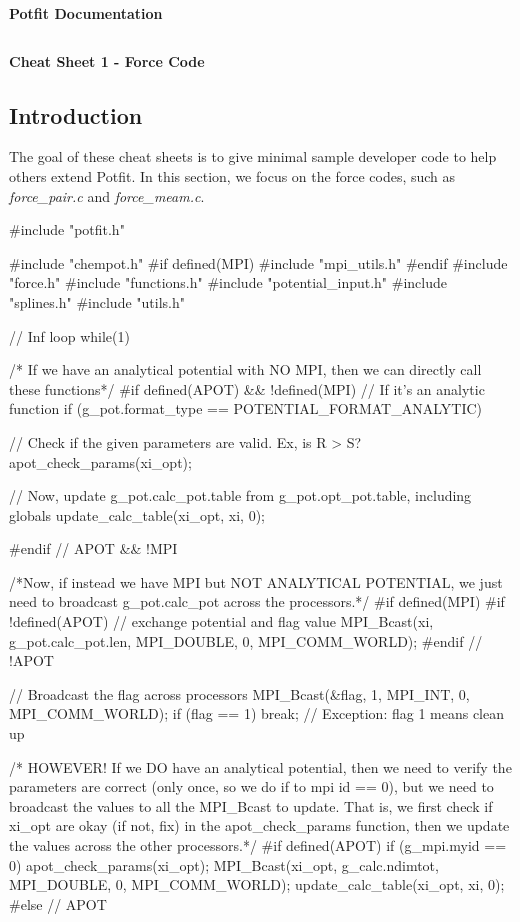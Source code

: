 \documentclass{article}
\newcommand\nline[0]{$ $\\}
\begin{document}
\centerline{\Large \textbf{Potfit Documentation}}
\nline
\centerline{\large \textbf{Cheat Sheet 1 - Force Code}}
\subsection*{Introduction}
The goal of these cheat sheets is to give minimal sample developer code to help others extend Potfit.
In this section, we focus on the force codes, such as \emph{force\_pair.c} and \emph{force\_meam.c}.

\begin{ccode}

#include "potfit.h"

#include "chempot.h"
#if defined(MPI)
#include "mpi_utils.h"
#endif
#include "force.h"
#include "functions.h"
#include "potential_input.h"
#include "splines.h"
#include "utils.h"


// Inf loop
while(1){


  /* If we have an analytical potential with NO MPI, then we
     can directly call these functions*/
#if defined(APOT) && !defined(MPI)
  // If it's an analytic function
  if (g_pot.format_type == POTENTIAL_FORMAT_ANALYTIC) {
    // Check if the given parameters are valid.  Ex, is R > S?
    apot_check_params(xi_opt);

    // Now, update g_pot.calc_pot.table from g_pot.opt_pot.table, including globals
    update_calc_table(xi_opt, xi, 0);
  }
#endif  // APOT && !MPI

  /*Now, if instead we have MPI but NOT ANALYTICAL POTENTIAL, we just
    need to broadcast g_pot.calc_pot across the processors.*/
#if defined(MPI)
#if !defined(APOT)
  // exchange potential and flag value
  MPI_Bcast(xi, g_pot.calc_pot.len, MPI_DOUBLE, 0, MPI_COMM_WORLD);
#endif  // !APOT

  // Broadcast the flag across processors
  MPI_Bcast(&flag, 1, MPI_INT, 0, MPI_COMM_WORLD);
  if (flag == 1)
    break; // Exception: flag 1 means clean up

  /* HOWEVER!  If we DO have an analytical potential, then we need to verify the parameters
     are correct (only once, so we do if to mpi id == 0), but we need to broadcast the values
     to all the MPI_Bcast to update.  That is, we first check if xi_opt are okay (if not, fix)
     in the apot_check_params function, then we update the values across the other processors.*/
#if defined(APOT)
  if (g_mpi.myid == 0)
    apot_check_params(xi_opt);
  MPI_Bcast(xi_opt, g_calc.ndimtot, MPI_DOUBLE, 0, MPI_COMM_WORLD);
  update_calc_table(xi_opt, xi, 0);
#else   // APOT

}
\end{ccode}
\end{document}
